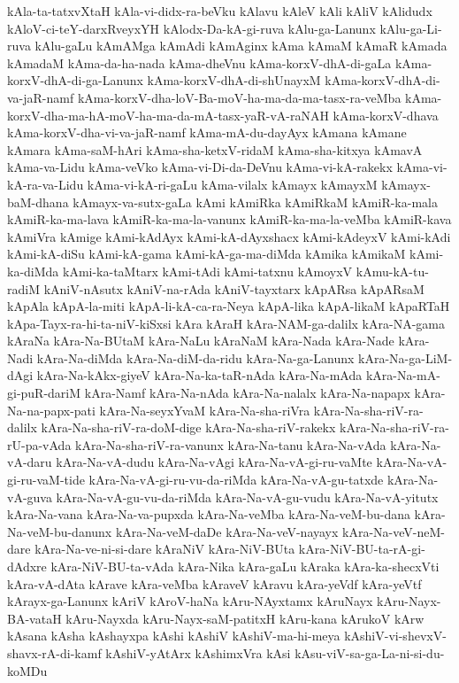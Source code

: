 {kAla-ta-tatxvXtaH
kAla-vi-didx-ra-beVku
kAlavu
kAleV
kAli
kAliV
kAlidudx
kAloV-ci-teY-darxRveyxYH
kAlodx-Da-kA-gi-ruva
kAlu-ga-Lanunx
kAlu-ga-Li-ruva
kAlu-gaLu
kAmAMga
kAmAdi
kAmAginx
kAma
kAmaM
kAmaR
kAmada
kAmadaM
kAma-da-ha-nada
kAma-dheVnu
kAma-korxV-dhA-di-gaLa
kAma-korxV-dhA-di-ga-Lanunx
kAma-korxV-dhA-di-shUnayxM
kAma-korxV-dhA-di-va-jaR-namf
kAma-korxV-dha-loV-Ba-moV-ha-ma-da-ma-tasx-ra-veMba
kAma-korxV-dha-ma-hA-moV-ha-ma-da-mA-tasx-yaR-vA-raNAH
kAma-korxV-dhava
kAma-korxV-dha-vi-va-jaR-namf
kAma-mA-du-dayAyx
kAmana
kAmane
kAmara
kAma-saM-hAri
kAma-sha-ketxV-ridaM
kAma-sha-kitxya
kAmavA
kAma-va-Lidu
kAma-veVko
kAma-vi-Di-da-DeVnu
kAma-vi-kA-rakekx
kAma-vi-kA-ra-va-Lidu
kAma-vi-kA-ri-gaLu
kAma-vilalx
kAmayx
kAmayxM
kAmayx-baM-dhana
kAmayx-va-sutx-gaLa
kAmi
kAmiRka
kAmiRkaM
kAmiR-ka-mala
kAmiR-ka-ma-lava
kAmiR-ka-ma-la-vanunx
kAmiR-ka-ma-la-veMba
kAmiR-kava
kAmiVra
kAmige
kAmi-kAdAyx
kAmi-kA-dAyxshacx
kAmi-kAdeyxV
kAmi-kAdi
kAmi-kA-diSu
kAmi-kA-gama
kAmi-kA-ga-ma-diMda
kAmika
kAmikaM
kAmi-ka-diMda
kAmi-ka-taMtarx
kAmi-tAdi
kAmi-tatxnu
kAmoyxV
kAmu-kA-tu-radiM
kAniV-nAsutx
kAniV-na-rAda
kAniV-tayxtarx
kApARsa
kApARsaM
kApAla
kApA-la-miti
kApA-li-kA-ca-ra-Neya
kApA-lika
kApA-likaM
kApaRTaH
kApa-Tayx-ra-hi-ta-niV-kiSxsi
kAra
kAraH
kAra-NAM-ga-dalilx
kAra-NA-gama
kAraNa
kAra-Na-BUtaM
kAra-NaLu
kAraNaM
kAra-Nada
kAra-Nade
kAra-Nadi
kAra-Na-diMda
kAra-Na-diM-da-ridu
kAra-Na-ga-Lanunx
kAra-Na-ga-LiM-dAgi
kAra-Na-kAkx-giyeV
kAra-Na-ka-taR-nAda
kAra-Na-mAda
kAra-Na-mA-gi-puR-dariM
kAra-Namf
kAra-Na-nAda
kAra-Na-nalalx
kAra-Na-napapx
kAra-Na-na-papx-pati
kAra-Na-seyxYvaM
kAra-Na-sha-riVra
kAra-Na-sha-riV-ra-dalilx
kAra-Na-sha-riV-ra-doM-dige
kAra-Na-sha-riV-rakekx
kAra-Na-sha-riV-ra-rU-pa-vAda
kAra-Na-sha-riV-ra-vanunx
kAra-Na-tanu
kAra-Na-vAda
kAra-Na-vA-daru
kAra-Na-vA-dudu
kAra-Na-vAgi
kAra-Na-vA-gi-ru-vaMte
kAra-Na-vA-gi-ru-vaM-tide
kAra-Na-vA-gi-ru-vu-da-riMda
kAra-Na-vA-gu-tatxde
kAra-Na-vA-guva
kAra-Na-vA-gu-vu-da-riMda
kAra-Na-vA-gu-vudu
kAra-Na-vA-yitutx
kAra-Na-vana
kAra-Na-va-pupxda
kAra-Na-veMba
kAra-Na-veM-bu-dana
kAra-Na-veM-bu-danunx
kAra-Na-veM-daDe
kAra-Na-veV-nayayx
kAra-Na-veV-neM-dare
kAra-Na-ve-ni-si-dare
kAraNiV
kAra-NiV-BUta
kAra-NiV-BU-ta-rA-gi-dAdxre
kAra-NiV-BU-ta-vAda
kAra-Nika
kAra-gaLu
kAraka
kAra-ka-shecxVti
kAra-vA-dAta
kArave
kAra-veMba
kAraveV
kAravu
kAra-yeVdf
kAra-yeVtf
kArayx-ga-Lanunx
kAriV
kAroV-haNa
kAru-NAyxtamx
kAruNayx
kAru-Nayx-BA-vataH
kAru-Nayxda
kAru-Nayx-saM-patitxH
kAru-kana
kArukoV
kArw
kAsana
kAsha
kAshayxpa
kAshi
kAshiV
kAshiV-ma-hi-meya
kAshiV-vi-shevxV-shavx-rA-di-kamf
kAshiV-yAtArx
kAshimxVra
kAsi
kAsu-viV-sa-ga-La-ni-si-du-koMDu
}
